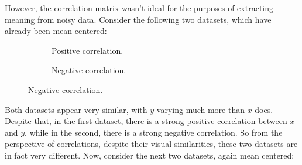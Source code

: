 \documentclass[letterpaper]{article}
\theoremstyle{remark}
\begin{document}
However, the correlation matrix wasn't ideal for the purposes of extracting meaning from noisy data. Consider the following two datasets, which have already been mean centered:
\begin{figure}[H]
\centering
\begin{subfigure}{.5\textwidth}
\centering
{}
\caption{Positive correlation.}
\end{subfigure}%
\begin{subfigure}{.5\textwidth}
\centering
{}
\caption{Negative correlation.}
\end{subfigure}
\captionsetup{labelformat=empty}
\end{figure}
Both datasets appear very similar, with $y$ varying much more than $x$ does. Despite that, in the first dataset, there is a strong positive correlation between $x$ and $y$, while in the second, there is a strong negative correlation. So from the perspective of correlations, despite their visual similarities, these two datasets are in fact very different. Now, consider the next two datasets, again mean centered:
\end{document}
